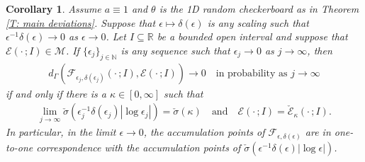 \documentclass[10pt,a4paper]{amsart}
\newtheorem{corollary}{Corollary}
\begin{document}
\begin{corollary} \label{C: characterize gamma limits} Assume $a \equiv 1$ and $\theta$ is the 1D random checkerboard as in Theorem \ref{T: main deviations}.  Suppose that $\epsilon \mapsto \delta(\epsilon)$ is any scaling such that $\epsilon^{-1} \delta(\epsilon) \to 0$ as $\epsilon \to 0$.  Let $I \subseteq \mathbb{R}$ be a bounded open interval and suppose that $\mathscr{E}(\cdot \, ; I) \in \mathcal{M}$. If $\{\epsilon_{j}\}_{j \in \mathbb{N}}$ is any sequence such that $\epsilon_{j} \to 0$ as $j \to \infty$, then
    \begin{align*}
        d_{\Gamma}( \mathscr{F}_{\epsilon_{j},\delta(\epsilon_{j})}(\cdot \, ; I ) , \mathscr{E} ( \cdot \, ; I ) ) \to 0 \quad \text{in probability as} \, \, j \to \infty
    \end{align*}
if and only if there is a $\kappa \in [0,\infty]$ such that 
    \begin{align*}
        \lim_{ j \to \infty } \check{\sigma} ( \epsilon_{j}^{-1} \delta(\epsilon_{j}) | \log \epsilon_{j} | ) = \check{\sigma}(\kappa) \quad \text{and} \quad \mathscr{E}( \cdot \, ; I ) = \check{\mathscr{E}}_{\kappa}(\cdot \, ; I ) . 
    \end{align*}
In particular, in the limit $\epsilon \to 0$, the accumulation points of $\mathscr{F}_{\epsilon,\delta(\epsilon)}$ are in one-to-one correspondence with the accumulation points of $\check{\sigma}(\epsilon^{-1} \delta(\epsilon) |\log \epsilon|)$. \end{corollary}
\end{document}
